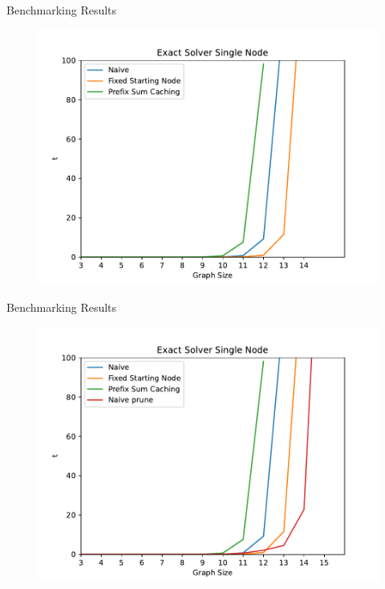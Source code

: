 \begin{frame}{Benchmarking Results}
  \vspace{-0.25cm}
  \begin{figure}
    \includegraphics[width=\linewidth,height=.9\textheight,keepaspectratio]{./assets/v2.pdf}
  \end{figure}
\end{frame}
\begin{frame}{Benchmarking Results}
  \vspace{-0.25cm}
  \begin{figure}
    \includegraphics[width=\linewidth,height=.9\textheight,keepaspectratio]{./assets/v3.pdf}
  \end{figure}
\end{frame}
